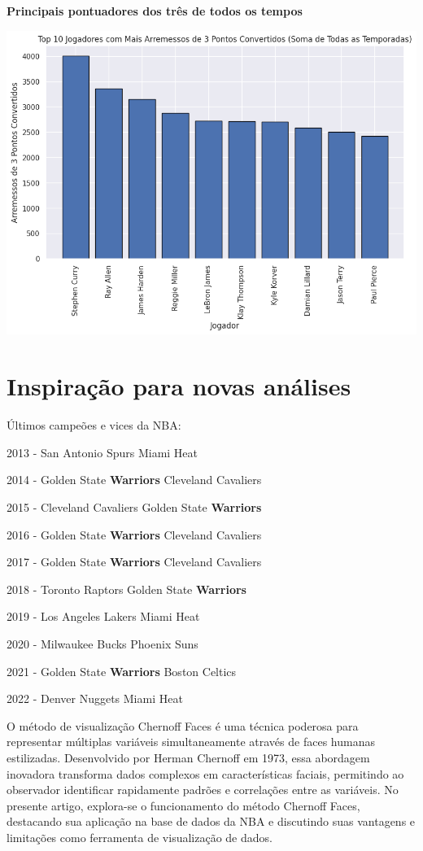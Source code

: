 \documentclass[
]{book}
\begin{document}
\textbf{Principais pontuadores dos três de todos os tempos}

\includegraphics{imagens/19.png}

\hypertarget{inspirauxe7uxe3o-para-novas-anuxe1lises}{%
\chapter{Inspiração para novas análises}\label{inspirauxe7uxe3o-para-novas-anuxe1lises}}

Últimos campeões e vices da NBA:

2013 - San Antonio Spurs \textbar{} Miami Heat

2014 - Golden State \textbf{Warriors} \textbar{} Cleveland Cavaliers

2015 - Cleveland Cavaliers \textbar{} Golden State \textbf{Warriors}

2016 - Golden State \textbf{Warriors} \textbar{} Cleveland Cavaliers

2017 - Golden State \textbf{Warriors} \textbar{} Cleveland Cavaliers

2018 - Toronto Raptors \textbar{} Golden State \textbf{Warriors}

2019 - Los Angeles Lakers \textbar{} Miami Heat

2020 - Milwaukee Bucks \textbar{} Phoenix Suns

2021 - Golden State \textbf{Warriors} \textbar{} Boston Celtics

2022 - Denver Nuggets \textbar{} Miami Heat

O método de visualização Chernoff Faces é uma técnica poderosa para representar múltiplas variáveis \hspace{0pt}\hspace{0pt}simultaneamente através de faces humanas estilizadas. Desenvolvido por Herman Chernoff em 1973, essa abordagem inovadora transforma dados complexos em características faciais, permitindo ao observador identificar rapidamente padrões e correlações entre as variáveis. No presente artigo, explora-se o funcionamento do método Chernoff Faces, destacando sua aplicação na base de dados da NBA e discutindo suas vantagens e limitações como ferramenta de visualização de dados.
\end{document}
